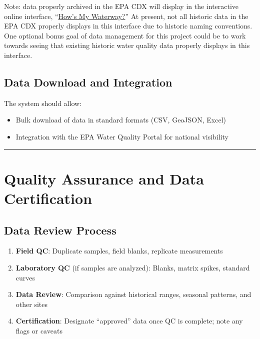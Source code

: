\documentclass[
  letterpaper,
]{scrbook}
\providecommand{\tightlist}{%
  \setlength{\itemsep}{0pt}\setlength{\parskip}{0pt}}\usepackage{longtable,booktabs,array}
\begin{document}
Note: data properly archived in the EPA CDX will display in the
interactive online interface, ``\href{https://mywaterway.epa.gov/}{How's
My Waterway?}'' At present, not all historic data in the EPA CDX
properly displays in this interface due to historic naming conventions.
One optional bonus goal of data management for this project could be to
work towards seeing that existing historic water quality data properly
displays in this interface.

\subsection{Data Download and
Integration}\label{data-download-and-integration}

The system should allow:

\begin{itemize}
\tightlist
\item
  Bulk download of data in standard formats (CSV, GeoJSON, Excel)
\item
  Integration with the EPA Water Quality Portal for national visibility
\end{itemize}

\begin{center}\rule{0.5\linewidth}{0.5pt}\end{center}

\section{Quality Assurance and Data
Certification}\label{quality-assurance-and-data-certification}

\subsection{Data Review Process}\label{data-review-process}

\begin{enumerate}
\def\labelenumi{\arabic{enumi}.}
\tightlist
\item
  \textbf{Field QC}: Duplicate samples, field blanks, replicate
  measurements
\item
  \textbf{Laboratory QC} (if samples are analyzed): Blanks, matrix
  spikes, standard curves
\item
  \textbf{Data Review}: Comparison against historical ranges, seasonal
  patterns, and other sites
\item
  \textbf{Certification}: Designate ``approved'' data once QC is
  complete; note any flags or caveats
\end{enumerate}
\end{document}

